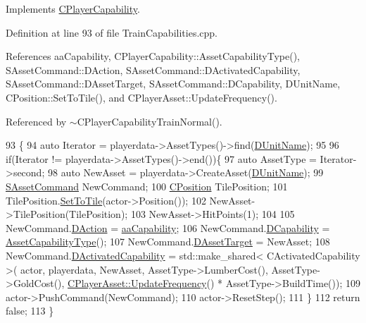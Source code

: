Implements \hyperlink{classCPlayerCapability_a2ca6fd7fbd9c0178f1cf1d049c63825f}{C\+Player\+Capability}.



Definition at line 93 of file Train\+Capabilities.\+cpp.



References aa\+Capability, C\+Player\+Capability\+::\+Asset\+Capability\+Type(), S\+Asset\+Command\+::\+D\+Action, S\+Asset\+Command\+::\+D\+Activated\+Capability, S\+Asset\+Command\+::\+D\+Asset\+Target, S\+Asset\+Command\+::\+D\+Capability, D\+Unit\+Name, C\+Position\+::\+Set\+To\+Tile(), and C\+Player\+Asset\+::\+Update\+Frequency().



Referenced by $\sim$\+C\+Player\+Capability\+Train\+Normal().


\begin{DoxyCode}
93                                                                                                            
                                                               \{
94     \textcolor{keyword}{auto} Iterator = playerdata->AssetTypes()->find(\hyperlink{classCPlayerCapabilityTrainNormal_aed40686355e78c151910e23ea2d9d32c}{DUnitName});
95     
96     \textcolor{keywordflow}{if}(Iterator != playerdata->AssetTypes()->end())\{
97         \textcolor{keyword}{auto} AssetType = Iterator->second;
98         \textcolor{keyword}{auto} NewAsset = playerdata->CreateAsset(\hyperlink{classCPlayerCapabilityTrainNormal_aed40686355e78c151910e23ea2d9d32c}{DUnitName});
99         \hyperlink{structSAssetCommand}{SAssetCommand} NewCommand;
100         \hyperlink{classCPosition}{CPosition} TilePosition;
101         TilePosition.\hyperlink{classCPosition_ae302aa21792de64c97de29e2cbbfeb94}{SetToTile}(actor->Position());
102         NewAsset->TilePosition(TilePosition);
103         NewAsset->HitPoints(1);
104         
105         NewCommand.\hyperlink{structSAssetCommand_a8edd3b3d59a76d5514ba403bc8076a75}{DAction} = \hyperlink{GameDataTypes_8h_ab47668e651a3032cfb9c40ea2d60d670acf9fb164e8abd71c71f4a8c7fda360d4}{aaCapability};
106         NewCommand.\hyperlink{structSAssetCommand_a734ea7c6847457b437360f333f570ff9}{DCapability} = \hyperlink{classCPlayerCapability_a433bb196cd6ab6a932f1cac102b3aa98}{AssetCapabilityType}();
107         NewCommand.\hyperlink{structSAssetCommand_a3d9b43f6e59c386c48c41a65448a0c39}{DAssetTarget} = NewAsset;
108         NewCommand.\hyperlink{structSAssetCommand_ad8beda19520811cc70fe1eab16c774dd}{DActivatedCapability} = std::make\_shared< CActivatedCapability >(
      actor, playerdata, NewAsset, AssetType->LumberCost(), AssetType->GoldCost(), 
      \hyperlink{classCPlayerAsset_a0aff85b9552967a42f4f3f42cb59c19f}{CPlayerAsset::UpdateFrequency}() * AssetType->BuildTime());
109         actor->PushCommand(NewCommand);
110         actor->ResetStep();
111     \}
112     \textcolor{keywordflow}{return} \textcolor{keyword}{false};
113 \}
\end{DoxyCode}
